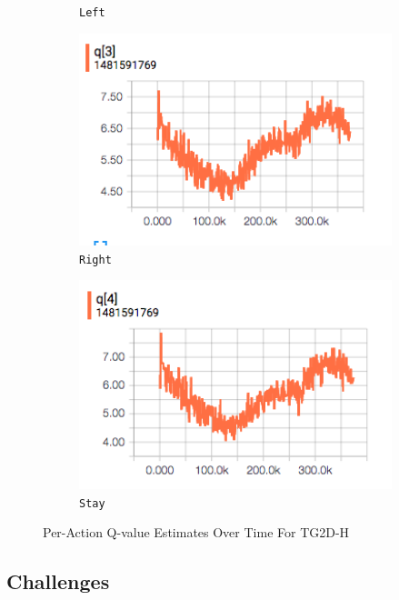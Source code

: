 \documentclass[12pt]{article}
\begin{document}
\begin{figure}[H]
\begin{subfigure}{0.19\textwidth}
    \caption*{\texttt{Left}}
    \centering
  \end{subfigure}
  \begin{subfigure}{0.19\textwidth}
    \includegraphics[width=1\textwidth]{report/TG2D-H_action_q/q3}
    \caption*{\texttt{Right}}
    \centering
  \end{subfigure}
  \begin{subfigure}{0.19\textwidth}
    \includegraphics[width=1\textwidth]{report/TG2D-H_action_q/q4}
    \caption*{\texttt{Stay}}
    \centering
  \end{subfigure}
  \centering
  \caption{Per-Action Q-value Estimates Over Time For TG2D-H}
  \label{fig:maxperaqv}
\end{figure}

\subsection{Challenges}
\end{document}
